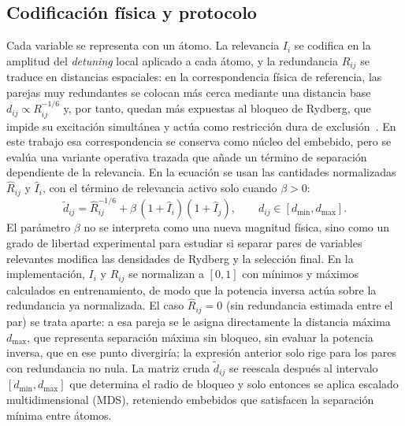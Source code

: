\subsection{Codificación física y protocolo}

Cada variable se representa con un átomo. La relevancia $I_i$ se
codifica en la amplitud del \textit{detuning} local aplicado a cada
átomo, y la redundancia $R_{ij}$ se traduce en distancias espaciales:
en la correspondencia física de referencia, las parejas muy
redundantes se colocan más cerca mediante una distancia base
$d_{ij}\propto R_{ij}^{-1/6}$ y, por tanto, quedan más expuestas al
bloqueo de Rydberg, que impide su excitación simultánea y actúa como
restricción dura de exclusión~\cite{orquin2026}. En este trabajo esa
correspondencia se conserva como núcleo del embebido, pero se evalúa
una variante operativa trazada que añade un término de separación
dependiente de la relevancia. En la ecuación se usan las cantidades
normalizadas $\widehat R_{ij}$ y $\widehat I_i$, con el término de
relevancia activo solo cuando $\beta>0$:
\begin{equation}
  \label{eq:qfs-distancia-beta}
  \tilde d_{ij} = \widehat R_{ij}^{-1/6} +
  \beta\,(1+\widehat I_i)(1+\widehat I_j),
  \qquad d_{ij}\in[d_{\min},d_{\max}].
\end{equation}
El parámetro $\beta$ no se interpreta como una nueva magnitud física,
sino como un grado de libertad experimental para estudiar si separar
pares de variables relevantes modifica las densidades de Rydberg y la
selección final. En la implementación, $I_i$ y $R_{ij}$ se normalizan a
$[0,1]$ con mínimos y máximos calculados en entrenamiento, de modo que
la potencia inversa actúa sobre la redundancia ya normalizada. El caso
$\widehat R_{ij}=0$ (sin redundancia estimada entre el par) se trata
aparte: a esa pareja se le asigna directamente la distancia máxima
$d_{\max}$, que representa separación máxima sin bloqueo, sin evaluar la
potencia inversa, que en ese punto divergiría; la expresión anterior
solo rige para los pares con redundancia no nula. La matriz cruda
$\tilde d_{ij}$ se reescala después al intervalo $[d_{\min},d_{\max}]$
que determina el radio de bloqueo y solo entonces se aplica escalado
multidimensional (MDS), reteniendo embebidos que satisfacen la
separación mínima entre átomos.

